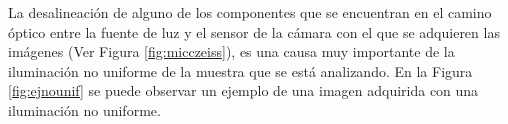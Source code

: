 La desalineación de alguno de los componentes que se encuentran en el camino óptico entre la fuente de luz y el sensor de la cámara con el que se adquieren las imágenes (Ver Figura \ref{fig:micczeiss}), es una causa muy importante de la iluminación no uniforme de la muestra que se está analizando. En la Figura \ref{fig:ejnounif} se puede observar un ejemplo de una imagen adquirida con una iluminación no uniforme.
	\begin{figure}[H]
		\begin{floatrow}
		\end{floatrow}
	\end{figure}
	
